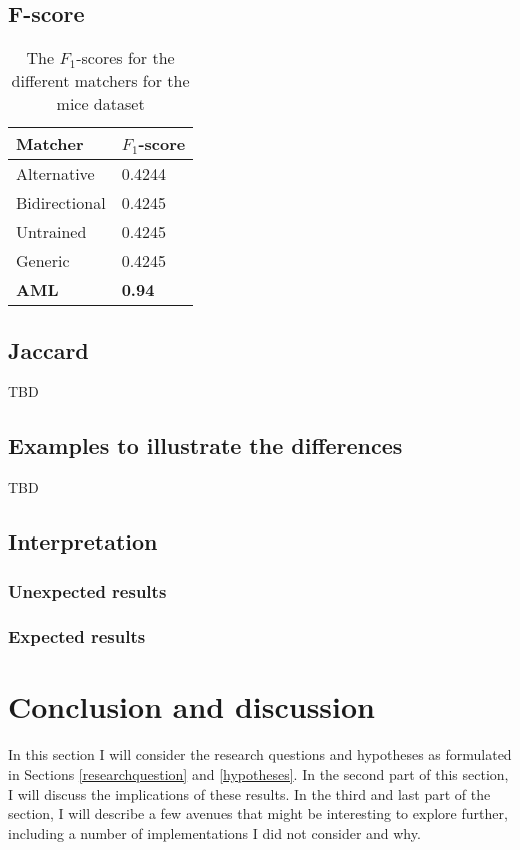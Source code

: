 \documentclass{article}
\begin{document}
  \subsection{F-score}
  \begin{table}[H]
  \begin{tabular}{l|l}
  \textbf{Matcher} & \textbf{$F_1$-score}\\
  \hline
  Alternative & 0.4244\\
  Bidirectional & 0.4245\\
  Untrained & 0.4245\\
  Generic & 0.4245\\
  \textbf{AML} & \textbf{0.94}\\ %
  \end{tabular}
  \caption{The $F_1$-scores for the different matchers for the mice dataset}
  \label{fscores}
  \end{table}
  \subsection{Jaccard}
  TBD
  \subsection{Examples to illustrate the differences}
  TBD
   
 \newpage
 \subsection{Interpretation}
 \subsubsection{Unexpected results}
 \subsubsection{Expected results}
  
 \newpage
 \section{Conclusion and discussion}
 In this section I will consider the research questions and hypotheses as formulated in Sections \ref{researchquestion} and \ref{hypotheses}. In the second part of this section, I will discuss the implications of these results. In the third and last part of the section, I will describe a few avenues that might be interesting to explore further, including a number of implementations I did not consider and why.
 
\end{document}
